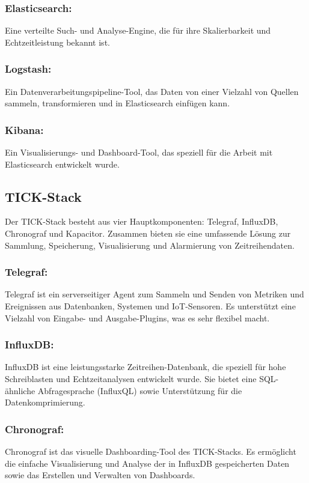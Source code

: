 \subsubsection{Elasticsearch:}
Eine verteilte Such- und Analyse-Engine, die für ihre Skalierbarkeit und Echtzeitleistung bekannt ist.

\subsubsection{Logstash:}
Ein Datenverarbeitungspipeline-Tool, das Daten von einer Vielzahl von Quellen sammeln, transformieren und in Elasticsearch einfügen kann.

\subsubsection{Kibana:}
Ein Visualisierungs- und Dashboard-Tool, das speziell für die Arbeit mit Elasticsearch entwickelt wurde.

\subsection{TICK-Stack}
Der TICK-Stack besteht aus vier Hauptkomponenten: Telegraf, InfluxDB, Chronograf und Kapacitor. Zusammen bieten sie eine umfassende Lösung zur Sammlung, Speicherung, Visualisierung und Alarmierung von Zeitreihendaten.

\subsubsection{Telegraf:}
Telegraf ist ein serverseitiger Agent zum Sammeln und Senden von Metriken und Ereignissen aus Datenbanken, Systemen und IoT-Sensoren. Es unterstützt eine Vielzahl von Eingabe- und Ausgabe-Plugins, was es sehr flexibel macht.

\subsubsection{InfluxDB:}
InfluxDB ist eine leistungsstarke Zeitreihen-Datenbank, die speziell für hohe Schreiblasten und Echtzeitanalysen entwickelt wurde. Sie bietet eine SQL-ähnliche Abfragesprache (InfluxQL) sowie Unterstützung für die Datenkomprimierung.

\subsubsection{Chronograf:}
Chronograf ist das visuelle Dashboarding-Tool des TICK-Stacks. Es ermöglicht die einfache Visualisierung und Analyse der in InfluxDB gespeicherten Daten sowie das Erstellen und Verwalten von Dashboards.

